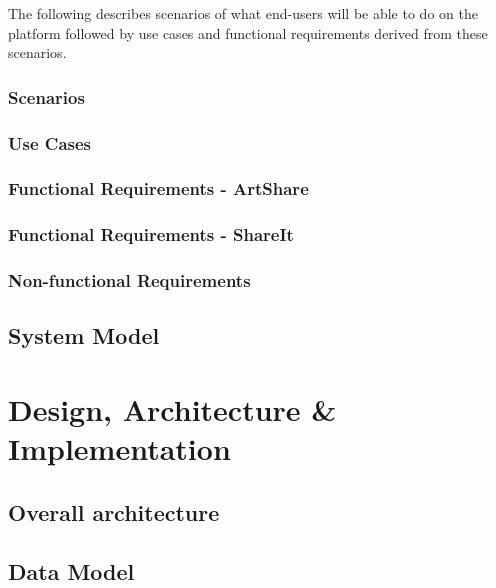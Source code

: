 \documentclass{report}
\begin{document}
The following describes scenarios of what end-users will be able to do on the platform followed by use cases and functional requirements derived from these scenarios.


\subsection{Scenarios}


\newpage
\subsection{Use Cases}
\FloatBarrier



\FloatBarrier
\newpage \subsection{Functional Requirements - ArtShare}


\newpage \subsection{Functional Requirements - ShareIt}


\newpage \subsection{Non-functional Requirements}


\section{System Model}

\chapter{Design, Architecture \& Implementation}

\section{Overall architecture}

\section{Data Model}
\end{document}
